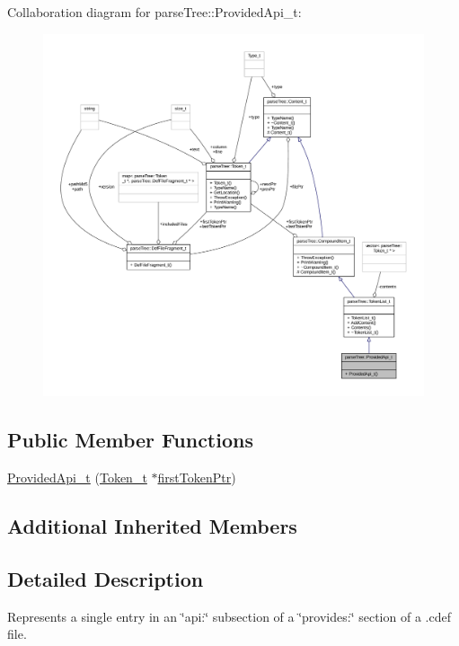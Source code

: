 Collaboration diagram for parse\+Tree\+:\+:Provided\+Api\+\_\+t\+:
\nopagebreak
\begin{figure}[H]
\begin{center}
\leavevmode
\includegraphics[width=350pt]{structparse_tree_1_1_provided_api__t__coll__graph}
\end{center}
\end{figure}
\subsection*{Public Member Functions}
\begin{DoxyCompactItemize}
\item 
\hyperlink{structparse_tree_1_1_provided_api__t_ac9707f7ddfe4da2de30fb666c3b99dfc}{Provided\+Api\+\_\+t} (\hyperlink{structparse_tree_1_1_token__t}{Token\+\_\+t} $\ast$\hyperlink{structparse_tree_1_1_compound_item__t_a587020c943e760cb0152dd8cd31e21ef}{first\+Token\+Ptr})
\end{DoxyCompactItemize}
\subsection*{Additional Inherited Members}


\subsection{Detailed Description}
Represents a single entry in an \char`\"{}api\+:\char`\"{} subsection of a \char`\"{}provides\+:\char`\"{} section of a .cdef file. 

